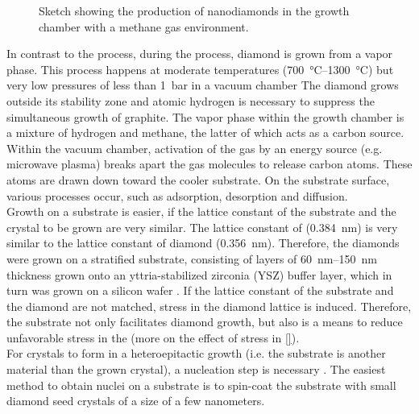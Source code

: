 	\begin{figure}[tp]
		\centering
		\caption{Sketch showing the production of \CVD nanodiamonds in the growth chamber with a methane gas environment.}
		\label{fig::cvd_sketch}
	\end{figure}

	In contrast to the \HPHT process,  during the \cvd process, diamond is grown from a vapor phase.
	This process happens at moderate temperatures (\SIrange{700}{1300}{\celsius}) but very low pressures of less than \SI{1}{\bar} in a vacuum chamber \cite{}
	The diamond grows outside its stability zone and atomic hydrogen is necessary to suppress the simultaneous growth of graphite.
	The vapor phase within the growth chamber is a mixture of hydrogen and methane, the latter of which acts as a carbon source.
	Within the vacuum chamber, activation of the gas by an energy source (e.g. microwave plasma) breaks apart the gas molecules to release carbon atoms. 
	These atoms are drawn down toward the cooler substrate.
	On the substrate surface, various processes occur, such as adsorption, desorption and diffusion.
	\\
	Growth on a substrate is easier, if the lattice constant of the substrate and the crystal to be grown are very similar.
	The lattice constant of \ir (\SI{0.384}{nm}\cite{Arblaster2010}) is very similar to the lattice constant of diamond (\SI{0.356}{nm}\cite{Davis1993}).
	Therefore, the diamonds were grown on a stratified substrate, consisting of \ir layers of \SIrange{60}{150}{nm} thickness grown onto an yttria-stabilized zirconia (YSZ) buffer layer, which in turn was grown on a silicon wafer \cite{Gsell2004a}.
	If the lattice constant of the substrate and the diamond are not matched, stress in the diamond lattice is induced.
	Therefore, the \ir substrate not only facilitates diamond growth, but also is a means to reduce unfavorable stress in the \nds (more on the effect of stress in \autoref{}).
	\\
	For crystals to form in a heteroepitactic growth (i.e. the substrate is another material than the grown crystal), a nucleation step is necessary \cite{Schreck2014a}.
	The easiest method to obtain nuclei on a substrate is to spin-coat the substrate with small diamond seed crystals of a size of a few nanometers. 
